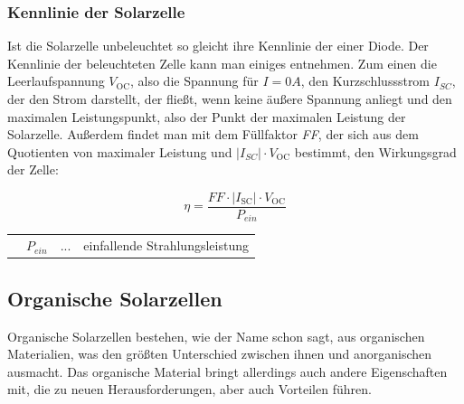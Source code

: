 \documentclass[slug=SZ, room=Hermann-Krone-Bau\,\ Labor\ 1.25,
supervisor=Martin\ Kroll, coursedate=14.\ 11.\ 2019]{../../Lab_Report_LaTeX/lab_report}
\newcommand{\voc}{V_{\text{OC}}}
\newcommand{\isc}{I_{\text{SC}}}
\begin{document}
\subsubsection{Kennlinie der Solarzelle}

Ist die Solarzelle unbeleuchtet so gleicht ihre Kennlinie der einer Diode.
Der Kennlinie der beleuchteten Zelle kann man einiges entnehmen.
Zum einen die Leerlaufspannung \(\voc\), also die Spannung für \(I=0 A\), den Kurzschlussstrom \(I_{SC}\), der den
Strom darstellt, der fließt, wenn keine äußere Spannung anliegt und den maximalen Leistungspunkt, also der Punkt
der maximalen Leistung der Solarzelle. Außerdem findet man mit dem Füllfaktor \emph{FF}, der sich aus dem
Quotienten von maximaler Leistung und \(|I_{SC}| \cdot \voc\) bestimmt, den Wirkungsgrad der Zelle:

\begin{equation}\label{eq:wirkgrad}
        \eta = \frac{FF \cdot |\isc| \cdot \voc}{P_{ein}}
\end{equation}

\begin{tabular}{llll}
         & \(P_{ein}\) & ... & einfallende Strahlungsleistung
\end{tabular}

\subsection{Organische Solarzellen}
\label{sec:orgsolar}

Organische Solarzellen bestehen, wie der Name schon sagt, aus organischen Materialien, was den größten
Unterschied zwischen ihnen und anorganischen ausmacht.
Das organische Material bringt allerdings auch andere Eigenschaften mit, die zu neuen Herausforderungen, aber
auch Vorteilen führen.\\
\end{document}
